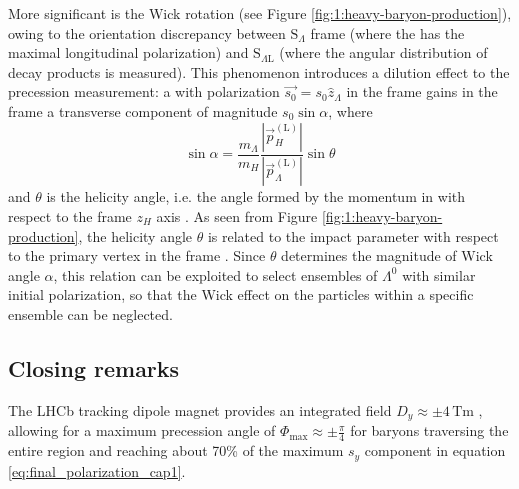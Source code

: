 More significant is the Wick rotation (see Figure \ref{fig:1:heavy-baryon-production}), owing to the orientation discrepancy between $\text{S}_\Lambda$ frame (where the \lz has the maximal longitudinal polarization)  and $\text{S}_{\Lambda \text{L}}$ (where the angular distribution of \lz decay products is measured).
This phenomenon introduces a dilution effect to the precession measurement: a \lz with polarization $\vec{s_0} = s_0 \hat{z}_\Lambda$ in the \slambda frame gains in the \slambdal frame a transverse component of magnitude $s_0 \sin\alpha$, where
\begin{equation}
\sin\alpha =
\frac{m_\Lambda}{m_H}
\frac{\left\lvert \vec{p}_H^{(\text{L})} \right\lvert}{\left\lvert \vec{p}_\Lambda^{(\text{L})} \right\lvert}
\sin\theta
\label{eq:1:wick_rotation}
\end{equation}
and $\theta$ is the \lz helicity angle, i.e. the angle formed by the \lz momentum in \shad with respect to the frame $z_H$ axis \cite{spinInParticlePhysics}.
As seen from Figure \ref{fig:1:heavy-baryon-production}, the helicity angle $\theta$ is related to the impact parameter with respect to the primary vertex in the \slab frame \cite{GROSNICK1990269}.
Since $\theta$ determines the magnitude of Wick angle $\alpha$, this relation can be exploited to select ensembles of $\Lambda^0$ with similar initial polarization, so that the Wick effect on the particles within a specific ensemble can be neglected.

\subsection{Closing remarks}

The LHCb tracking dipole magnet provides an integrated field $D_y \approx \pm 4 \,\si{\tesla\meter}$ \cite{LHCbDetectorPerformance}, allowing for a maximum precession angle of $\Phi_\text{max} \approx \pm \frac{\pi}{4}$ for \lz baryons traversing the entire region and reaching about 70\% of the maximum $s_y$ component in equation \eqref{eq:final_polarization_cap1}.


